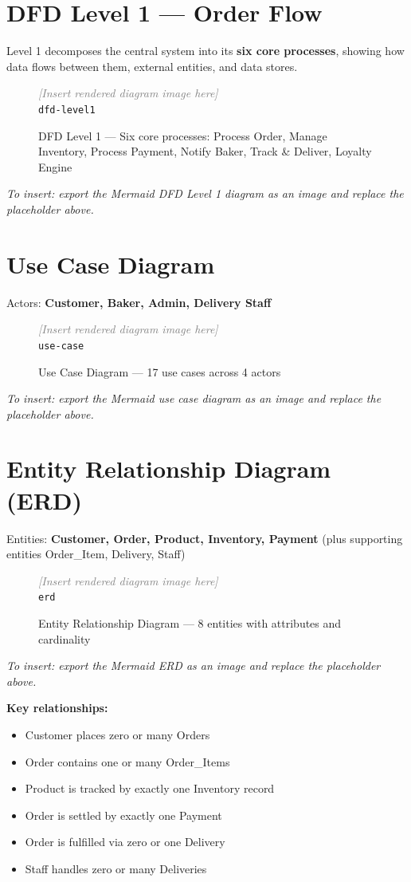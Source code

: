 \documentclass[12pt, a4paper]{report}
\newcommand{\diagramplaceholder}[2]{%
  \begin{figure}[H]
    \centering
    \begin{mdframed}[linecolor=coderule, backgroundcolor=codegray,
                     innerleftmargin=12pt, innerrightmargin=12pt,
                     innertopmargin=20pt, innerbottommargin=20pt]
      \centering
      \textit{\textcolor{gray}{[Insert rendered diagram image here]}}\\[6pt]
      \texttt{\small #1}
    \end{mdframed}
    \caption{#2}
    \label{fig:#1}
  \end{figure}
}
\begin{document}
\section{DFD Level 1 --- Order Flow}

Level 1 decomposes the central system into its \textbf{six core processes},
showing how data flows between them, external entities, and data stores.

\diagramplaceholder{dfd-level1}{DFD Level 1 --- Six core processes: Process Order, Manage Inventory, Process Payment, Notify Baker, Track \& Deliver, Loyalty Engine}

\textit{To insert: export the Mermaid DFD Level 1 diagram as an image and
replace the placeholder above.}

\section{Use Case Diagram}

Actors: \textbf{Customer, Baker, Admin, Delivery Staff}

\diagramplaceholder{use-case}{Use Case Diagram --- 17 use cases across 4 actors}

\textit{To insert: export the Mermaid use case diagram as an image and replace
the placeholder above.}

\section{Entity Relationship Diagram (ERD)}

Entities: \textbf{Customer, Order, Product, Inventory, Payment} (plus
supporting entities Order\_Item, Delivery, Staff)

\diagramplaceholder{erd}{Entity Relationship Diagram --- 8 entities with attributes and cardinality}

\textit{To insert: export the Mermaid ERD as an image and replace the
placeholder above.}

\textbf{Key relationships:}
\begin{itemize}[noitemsep]
  \item Customer places zero or many Orders
  \item Order contains one or many Order\_Items
  \item Product is tracked by exactly one Inventory record
  \item Order is settled by exactly one Payment
  \item Order is fulfilled via zero or one Delivery
  \item Staff handles zero or many Deliveries
\end{itemize}
\end{document}
